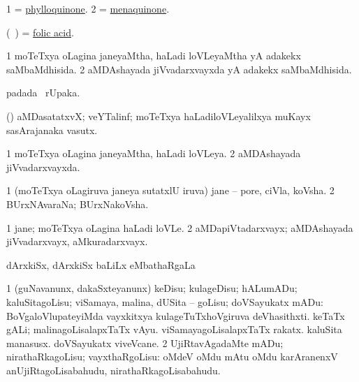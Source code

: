 \noindent 
\gl{\pagu}
\expl{}
\bmng
\bnum
\num{1} = \hyperref{kandict_p.pdf}{P}{phylloquinone}{phylloquinone}. 
\num{2} = \hyperref{kandict_m.pdf}{M}{menaquinone}{menaquinone}. 
\enum
\emng
\eentry

\bentry
{}
\gl{\nA}
\expl{}
\bmng
 (\kanmu\ \ame) = \hyperref{kandict_f.pdf}{F}{folic acid}{folic acid}. 
\emng
\eentry

\bentry
{} 
\gl{\gu}
\expl{}
\bmng
\bnum
\num{1} moTeTxya oLagina janeyaMtha, haLadi loVLeyaMtha yA adakekx saMbaMdhisida. 
\num{2} aMDAshayada jiVvadarxvayxda yA adakekx saMbaMdhisida. 
\enum
\emng
\eentry

\bentry 
{} 
\gl{\nA}
\expl{}
\bmng
  padada \bava\ rUpaka. 
\emng
\eentry

\bentry
{} 
\gl{\nA}
\expl{}
\bmng
 (\ravi) aMDasatatxvX; veYTalinf; moTeTxya haLadiloVLeyalilxya muKayx sasArajanaka vasutx. 
\emng
\eentry

\bentry
{} 
\gl{\gu}
\expl{}
\bmng
\bnum
\num{1} moTeTxya oLagina janeyaMtha, haLadi loVLeya. 
\num{2} aMDAshayada jiVvadarxvayxda. 
\enum
\emng
\eentry

\bentry
{}
\gl{\nA}
\expl{}
\bmng
\bnum
\num{1} (moTeTxya oLagiruva janeya sutatxlU iruva) jane -- pore, ciVla, koVsha. 
\num{2} BUrxNAvaraNa; BUrxNakoVsha. 
\enum
\emng
\eentry

\bentry
{} 
\gl{\nA}
\bmng
\bnum
\num{1} jane; moTeTxya oLagina haLadi loVLe. 
\num{2} aMDapiVtadarxvayx; aMDAshayada jiVvadarxvayx, aMkuradarxvayx. 
\enum
\emng
\eentry

\bentry 
{} 
\gl{\sapUpa}
\expl{}
\bmng
 dArxkiSx, dArxkiSx baLiLx eMbathaRgaLa \sapUpa 
\emng
\eentry

\bentry 
{} 
\gl{\sakirx}
\expl{}
\bmng
\bnum
\num{1} (guNavanunx, dakaSxteyanunx) keDisu; kulageDisu; hALumADu; kaluSitagoLisu; viSamaya, malina, dUSita -- goLisu; doVSayukatx mADu:  BoVgaloVlupateyiMda vayxkitxya kulageTuTxhoVgiruva deVhasithxti.  keTaTx gALi; malinagoLisalapxTaTx vAyu.  viSamayagoLisalapxTaTx rakatx.  kaluSita manasusx.  doVSayukatx viveVcane. 
\num{2} UjiRtavAgadaMte mADu; nirathaRkagoLisu; vayxthaRgoLisu:  oMdeV oMdu mAtu oMdu karAranenxV anUjiRtagoLisabahudu, nirathaRkagoLisabahudu. 
\enum
\emng
\eentry

